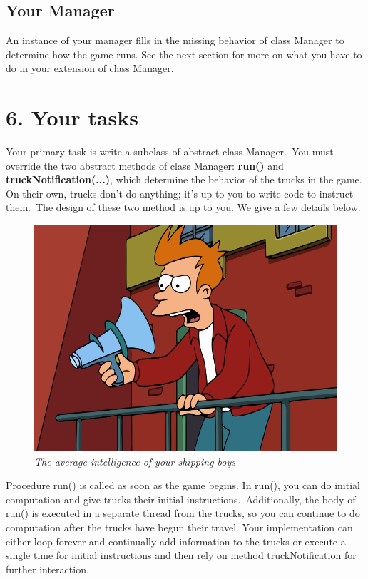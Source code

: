 \documentclass[11pt]{article}
\begin{document}
\subsection{Your Manager}
An instance of your manager fills in the missing behavior of class Manager to determine how the game runs. See the next section for more on what you have to do in your extension of class Manager.

\section{6. Your tasks}
Your primary task is write a subclass of abstract class Manager.\ You must override the two abstract methods of class Manager: \textbf{run()} and \textbf{truckNotification(...)}, which determine the behavior of the trucks in the game. On their own, trucks don't do anything; it's up to you to write code to instruct them.\ The
design of these two method is up to you. We give a few details below.\\

\begin{figure}[h]
\centerline{\includegraphics[scale=0.32]{fry.jpg}} 
\caption{\em{The average intelligence of your shipping boys}}
\end{figure}

Procedure run() is called as soon as the game begins. In run(), you can do initial computation and give trucks their initial instructions.\ Additionally, the body of run() is executed in a separate thread from the trucks, so you can continue to do computation after the trucks have begun their travel. Your implementation can either loop forever and continually add information to the trucks or execute a single time for initial instructions and then rely on method truckNotification for further interaction.\\
\end{document}
